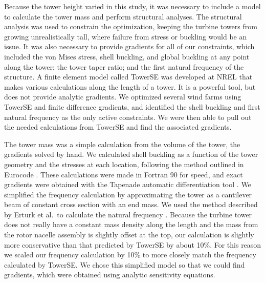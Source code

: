 Because the tower height varied in this study, it was necessary to include a model to calculate the tower mass and perform structural analyses. The structural analysis was used to constrain the optimization, keeping the turbine towers from growing unrealistically tall, where failure from stress or buckling would be an issue. 
It was also necessary to provide gradients for all of our constraints, which included the von Mises stress, shell buckling, and global buckling at any point along the tower; the tower taper ratio; and the first natural frequency of the structure. A finite element model called TowerSE was developed at NREL that makes various calculations along the length of a tower\cite{ning2013towerse}. 
It is a powerful tool, but does not provide analytic gradients. We optimized several wind farms using TowerSE and finite difference gradients, and identified the shell buckling and first natural frequency as the only active constraints. We were then able to pull out the needed calculations from TowerSE and find the associated gradients. 

The tower mass was a simple calculation from the volume of the tower, the gradients solved by hand.
We calculated shell buckling as a function of the tower geometry and the stresses at each location, following the method outlined in Eurocode \cite{en19931}. These calculations were made in Fortran 90 for speed, and exact gradients were obtained with the Tapenade automatic differentiation tool \cite{hascoet2013tapenade}. We simplified the frequency calculation by approximating the tower as a cantilever beam of constant cross section with an end mass. We used the method described by Erturk et al.\ to calculate the natural frequency \cite{erturk2011appendix}. Because the turbine tower does not really 
have a constant mass density along the length and the mass from the rotor nacelle assembly is slightly offset at the top, our calculation is slightly more conservative than that predicted by TowerSE by about 10\%. 
For this reason we scaled our frequency calculation by 10\% to more closely match the frequency calculated by TowerSE. We chose this simplified model so that we could find gradients, which were obtained using analytic sensitivity equations. 